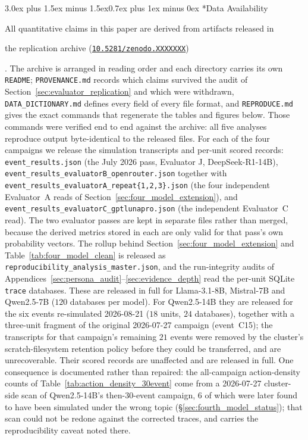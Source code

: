 \documentclass[11pt,journal,onecolumn]{IEEEtran}
\makeatletter
\renewcommand\section{\@startsection{section}{1}{\z@}%
  {3.0ex plus 1.5ex minus 1.5ex}{0.7ex plus 1ex minus 0ex}%
  {\normalfont\normalsize\centering\bfseries}}
\newif\ifecnanonymous
\newcommand{\ecnarchivedoi}{10.5281/zenodo.XXXXXXX}
\newcommand{\ecnarchiveurl}{https://doi.org/\ecnarchivedoi}
\newcommand{\ecnarchive}{%
  \ifecnanonymous
    the replication archive accompanying this submission%
  \else
    the replication archive (\href{\ecnarchiveurl}{\texttt{\ecnarchivedoi}})%
  \fi
}
\makeatother
\begin{document}
\section*{Data Availability}

All quantitative claims in this paper are derived from artifacts released in \ecnarchive. The archive is arranged in reading order and each directory carries its own \texttt{README}; \texttt{PROVENANCE.md} records which claims survived the audit of Section~\ref{sec:evaluator_replication} and which were withdrawn, \texttt{DATA\_DICTIONARY.md} defines every field of every file format, and \texttt{REPRODUCE.md} gives the exact commands that regenerate the tables and figures below. Those commands were verified end to end against the archive: all five analyses reproduce output byte-identical to the released files. For each of the four campaigns we release the simulation transcripts and per-unit scored records: \texttt{event\_results.json} (the July 2026 pass, Evaluator J, DeepSeek-R1-14B), \texttt{event\_results\_evaluatorB\_openrouter.json} together with \texttt{event\_results\_evaluatorA\_repeat\{1,2,3\}.json} (the four independent Evaluator~A reads of Section~\ref{sec:four_model_extension}), and \texttt{event\_results\_evaluatorC\_gptlunapro.json} (the independent Evaluator~C read). The two evaluator passes are kept in separate files rather than merged, because the derived metrics stored in each are only valid for that pass's own probability vectors. The rollup behind Section~\ref{sec:four_model_extension} and Table~\ref{tab:four_model_clean} is released as \texttt{reproducibility\_analysis\_master.json}, and the run-integrity audits of Appendices~\ref{sec:persona_audit}--\ref{sec:evidence_depth} read the per-unit SQLite \texttt{trace} databases. These are released in full for Llama-3.1-8B, Mistral-7B and Qwen2.5-7B ($120$ databases per model). For Qwen2.5-14B they are released for the six events re-simulated 2026-08-21 ($18$ units, $24$ databases), together with a three-unit fragment of the original 2026-07-27 campaign (event~C15); the transcripts for that campaign's remaining $21$ events were removed by the cluster's scratch-filesystem retention policy before they could be transferred, and are unrecoverable. Their scored records are unaffected and are released in full. One consequence is documented rather than repaired: the all-campaign action-density counts of Table~\ref{tab:action_density_30event} come from a 2026-07-27 cluster-side scan of Qwen2.5-14B's then-30-event campaign, 6 of which were later found to have been simulated under the wrong topic (\S\ref{sec:fourth_model_status}); that scan could not be redone against the corrected traces, and carries the reproducibility caveat noted there.
\end{document}
